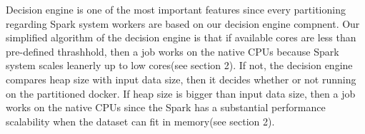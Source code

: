 Decision engine is one of the most important features
since every partitioning regarding Spark system workers are based
on our decision engine compnent.
Our simplified algorithm of the decision engine is that if available cores are
less than pre-defined thrashhold, then a job works on the native CPUs because
Spark system scales leanerly up to low cores(see section 2).
If not, the decision engine compares heap size with input data size, then
it decides whether or not running on the partitioned docker.
If heap size is bigger than input data size, then a job works on the native CPUs 
since the Spark has a substantial performance scalability when the dataset can
fit in memory(see section 2).
\else

\fi

